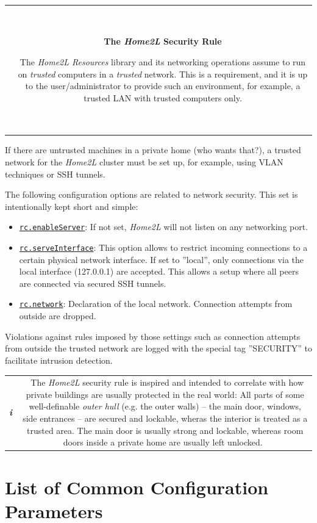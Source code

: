\documentclass[12pt,english,parskip=half,headheight=19pt]{scrreprt}
\newcommand{\infobox}[1]{
  \par
  \medskip
  \hfill
  \setlength\arrayrulewidth{1pt}
  \begin{tabular}[t]{c|c|}
    \parbox{1.8em}{\hfill\textit{\Huge\textbf{i}\,}}
    &
    \,\parbox{0.89\linewidth}{\setlength{\parskip}{0.5em} \small #1}\,
  \end{tabular}
  \medskip
  \par
}
\newcommand{\warnbox}[1]{
  \par
  \medskip
  \hfill
  \setlength\arrayrulewidth{1pt}
  \begin{tabular}[b]{c|c|}
    
    &
    \,\parbox{0.89\linewidth}{\setlength{\parskip}{0.5em}#1}\,
  \end{tabular}
  \medskip
  \par
}
\newcommand{\idx}[1]{#1\index{#1}}
\newcommand{\refenv}[1]{\hyperref[env:#1]{\texttt{#1}}}        %
\begin{document}
\warnbox{
  \textbf{The \textit{Home2L} Security Rule}

  The \textit{Home2L Resources} library and its networking operations assume to run on
  \textit{trusted} computers in a \textit{trusted} network.
  This is a requirement, and it is up to the user/administrator to provide
  such an environment, for example, a trusted LAN with trusted computers only.
}

If there are untrusted machines in a private home (who wants that?), a trusted network for the \textit{Home2L} cluster must be set up, for example, using VLAN techniques or SSH tunnels.

The following configuration options are related to network security.
This set is intentionally kept short and simple:

\begin{itemize}
\item
  \refenv{rc.enableServer}: If not set, \textit{Home2L} will not listen on any networking port.
\item
  \refenv{rc.serveInterface}: This option allows to restrict incoming connections
  to a certain physical network interface. If set to ”local”, only connections via
  the local interface (127.0.0.1) are accepted. This allows a setup where
  all peers are connected via secured SSH tunnels.
\item
  \refenv{rc.network}: Declaration of the local network. Connection attempts
  from outside are dropped.
\end{itemize}

Violations against rules imposed by those settings such as connection
attempts from outside the trusted network are logged with the special
tag ''SECURITY'' to facilitate intrusion detection.

\infobox{
  The \textit{Home2L} security rule is inspired and intended to correlate with how private
  buildings are usually protected in the real world:
  All parts of some well-definable \textit{outer hull} (e.g. the outer walls) -- the
  main door,  windows, side entrances -- are secured and lockable, wheras the
  interior is treated as a trusted area. The main door is usually strong and lockable, whereas
  room doors inside a private home are usually left unlocked.
}





\section{List of Common Configuration Parameters}
\label{sec:env-common}
\end{document}
